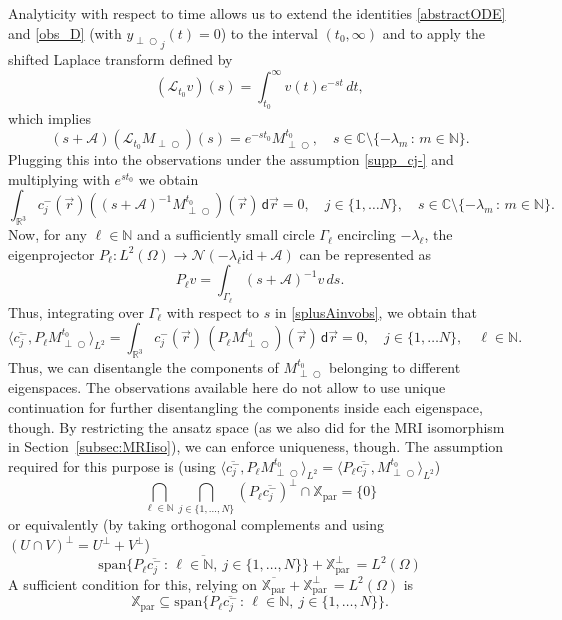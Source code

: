 \documentclass{ws-m3as}
\def\Mpp{M_{\perp\!\!\!\!\!\bigcirc}}
\def\yp{y_{\perp\!\!\!\!\!\bigcirc}}
\newcommand\Xpar{\mathbb{X}_{\text{par}}}
\begin{document}
Analyticity with respect to time allows us to extend the identities \eqref{abstractODE} and \eqref{obs_D} (with ${\yp}_j(t)=0$) to the interval $(t_0,\infty)$ and to apply the shifted Laplace transform defined by 
\[
(\mathcal{L}_{t_0}v)(s)=\int_{t_0}^\infty v(t) e^{-st}\,dt, 
\]
which implies
\[
(s+\mathcal{A})(\mathcal{L}_{t_0}\Mpp)(s)=e^{-st_0}\Mpp^{t_0},\quad s\in\mathbb{C}\setminus\{-\lambda_m\,:\,m\in\mathbb{N}\}.
\]
Plugging this into the observations under the assumption \eqref{supp_cj-} and multiplying with $e^{st_0}$ we obtain
\begin{equation}\label{splusAinvobs}
\int_{\mathbb{R}^3} c^-_j(\vec r) ((s+\mathcal{A})^{-1}\Mpp^{t_0})(\vec r) \,\textsf{d}\vec r=0, \quad j\in\{1,\ldots N\}, \quad s\in\mathbb{C}\setminus\{-\lambda_m\,:\,m\in\mathbb{N}\}.
\end{equation}
Now, for any $\ell\in\mathbb{N}$ and a sufficiently small circle $\Gamma_\ell$ encircling $-\lambda_\ell$, the eigenprojector $P_\ell:L^2(\Omega)\to \mathcal{N}(-\lambda_\ell\text{id}+\mathcal{A})$ can be represented as 
\[
P_\ell v=\int_{\Gamma_\ell}(s+\mathcal{A})^{-1}v\,ds.
\]
Thus, integrating over $\Gamma_\ell$ with respect to $s$ in \eqref{splusAinvobs}, we obtain that 
\[
\langle \overline{c_j^-} , P_\ell \Mpp^{t_0}\rangle_{L^2}=\int_{\mathbb{R}^3} c^-_j(\vec r)\, (P_\ell \Mpp^{t_0})(\vec r) \,\textsf{d}\vec r=0, \quad j\in\{1,\ldots N\}, \quad \ell\in\mathbb{N}.
\]
Thus, we can disentangle the components of $\Mpp^{t_0}$ belonging to different eigenspaces.
 The observations available here do not allow to use unique continuation for further disentangling the components inside each eigenspace, though. By restricting the ansatz space (as we also did for the MRI isomorphism in Section~\ref{subsec:MRIiso}), we can enforce uniqueness, though.
The assumption required for this purpose is
(using $\langle \overline{c_j^-} , P_\ell \Mpp^{t_0}\rangle_{L^2}= \langle P_\ell \overline{c_j^-} , \Mpp^{t_0}\rangle_{L^2}$)
\[
\bigcap_{\ell\in\mathbb{N}} \bigcap_{j\in \{1,\ldots,N\}} (P_\ell \overline{c_j^-})^\perp \cap \Xpar =\{0\}
\]
or equivalently (by taking orthogonal complements and using $(U\cap V)^\perp=U^\perp+V^\perp$)
\[
\overline{\text{span}\{P_\ell \overline{c_j^-}\, : \, \ell\in\mathbb{N}, \ j\in \{1,\ldots,N\}\}}+\Xpar^\perp \, = L^2(\Omega) 
\]
A sufficient condition for this, relying on $\overline{\Xpar}+\Xpar^\perp \, = L^2(\Omega)$ is 
\begin{equation}\label{assXpar_uniquenessD}
\Xpar\subseteq\text{span}\{P_\ell \overline{c_j^-}\, : \, \ell\in\mathbb{N}, \ j\in \{1,\ldots,N\}\}. 
\end{equation}
\end{document}
